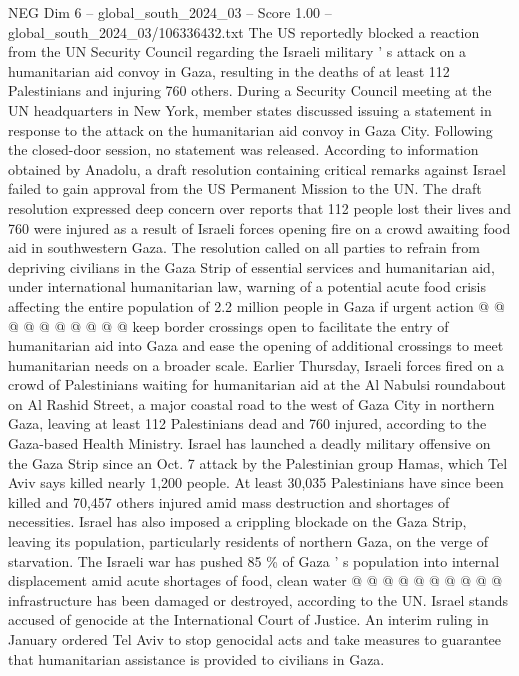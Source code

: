 \begin{textsample}{NEG Dim 6 – global\_south\_2024\_03 – Score 1.00 – global\_south\_2024\_03/106336432.txt}  \label{ex:f6_neg_396}
The US reportedly blocked a reaction from the UN Security Council regarding the Israeli military ' s attack on a humanitarian aid convoy in Gaza, resulting in the deaths of at least 112 Palestinians and injuring 760 others.
During a Security Council meeting at the UN headquarters in New York, member states discussed issuing a statement in response to the attack on the humanitarian aid convoy in Gaza City.
Following the closed-door session, no statement was released.
According to information obtained by Anadolu, a draft resolution containing critical remarks against Israel failed to gain approval from the US Permanent Mission to the UN.
The draft resolution expressed deep concern over reports that 112 people lost their lives and 760 were injured as a result of Israeli forces opening fire on a crowd awaiting food aid in southwestern Gaza.
The resolution called on all parties to refrain from depriving civilians in the Gaza Strip of essential services and humanitarian aid, under international humanitarian law, warning of a potential acute food crisis affecting the entire population of 2.2 million people in Gaza if urgent action @ @ @ @ @ @ @ @ @ @ keep border crossings open to facilitate the entry of humanitarian aid into Gaza and ease the opening of additional crossings to meet humanitarian needs on a broader scale.
Earlier Thursday, Israeli forces fired on a crowd of Palestinians waiting for humanitarian aid at the Al Nabulsi roundabout on Al Rashid Street, a major coastal road to the west of Gaza City in northern Gaza, leaving at least 112 Palestinians dead and 760 injured, according to the Gaza-based Health Ministry.
Israel has launched a deadly military offensive on the Gaza Strip since an Oct. 7 attack by the Palestinian group Hamas, which Tel Aviv says killed nearly 1,200 people.
At least 30,035 Palestinians have since been killed and 70,457 others injured amid mass destruction and shortages of necessities.
Israel has also imposed a crippling blockade on the Gaza Strip, leaving its population, particularly residents of northern Gaza, on the verge of starvation.
The Israeli war has pushed 85 \% of Gaza ' s population into internal displacement amid acute shortages of food, clean water @ @ @ @ @ @ @ @ @ @ infrastructure has been damaged or destroyed, according to the UN.
Israel stands accused of genocide at the International Court of Justice.
An interim ruling in January ordered Tel Aviv to stop genocidal acts and take measures to guarantee that humanitarian assistance is provided to civilians in Gaza.

\end{textsample}

